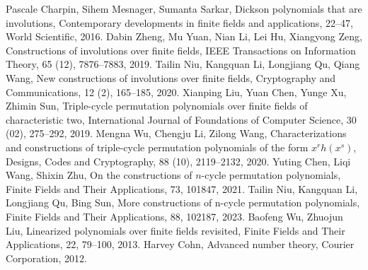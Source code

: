 \documentclass[12pt,a4paper]{article}
\begin{document}
\begin{thebibliography}{}
Pascale Charpin, Sihem Mesnager,  Sumanta Sarkar,	{{Dickson polynomials that are involutions}}, Contemporary developments in finite fields and applications, 22--47, World Scientific, 2016.
Dabin Zheng,  Mu Yuan,  Nian Li, Lei Hu,  Xiangyong Zeng, 	{{Constructions of involutions over finite fields}},
IEEE Transactions on Information Theory,
65 (12), 7876--7883, 2019.	
Tailin Niu,   Kangquan Li, Longjiang Qu, Qiang Wang, 	{{New constructions of involutions over finite fields}},
Cryptography and Communications, 12 (2),
165--185, 2020.
Xianping Liu,  Yuan Chen,  Yunge Xu,  Zhimin Sun, 	{{Triple-cycle permutation polynomials over finite fields of characteristic two}}, International Journal of Foundations of Computer Science, 30 (02), 275--292, 2019.
Mengna Wu,  Chengju Li,  Zilong Wang, 	{{Characterizations and constructions of triple-cycle permutation polynomials of the form  $x^rh(x^{s})$}}, Designs, Codes and Cryptography, 88 (10), 2119--2132, 2020.
Yuting Chen,  Liqi Wang,  Shixin Zhu, 	{{On the constructions of $n$-cycle permutation polynomials}}, Finite Fields and Their Applications, 73, 101847, 2021.
  Tailin Niu, Kangquan Li,  Longjiang Qu,  Bing Sun,  {More constructions of n-cycle permutation polynomials}, Finite Fields and Their Applications, 88, 102187, 2023.
 Baofeng Wu, Zhuojun Liu, 	{Linearized polynomials over finite fields revisited}, Finite Fields and Their Applications, 22, 79--100, 2013.
Harvey Cohn, 	{Advanced number theory},
Courier Corporation, 2012.


\end{thebibliography}
\end{document}
